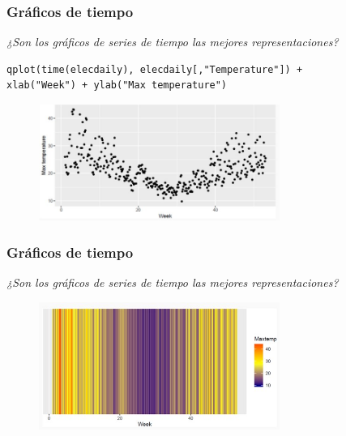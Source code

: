 \documentclass[10pt]{beamer}
\begin{document}
\begin{frame}[fragile]
\frametitle{Gráficos de tiempo}

\begin{center}
\textit{¿Son los gráficos de series de tiempo las mejores representaciones?}
\end{center}


\lstset{language=r,label= ,caption= ,captionpos=b,numbers=none}
\begin{lstlisting}
qplot(time(elecdaily), elecdaily[,"Temperature"]) +
xlab("Week") + ylab("Max temperature")
\end{lstlisting}

\pause


\begin{figure}
\begin{center}
    \includegraphics[width=0.7\textwidth]{Imagen16.JPG}
\end{center}
\end{figure}




\end{frame}






\begin{frame}[fragile]
\frametitle{Gráficos de tiempo}

\begin{center}
\textit{¿Son los gráficos de series de tiempo las mejores representaciones?}
\end{center}



\begin{figure}
\begin{center}
    \includegraphics[width=0.7\textwidth]{Imagen17.JPG}
\end{center}
\end{figure}




\end{frame}
\end{document}
